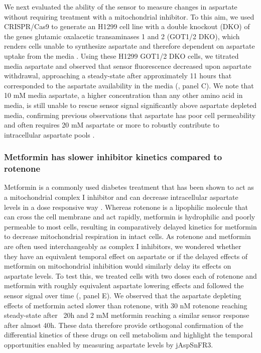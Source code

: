 \documentclass[9pt,lineno]{elife}
\begin{document}
We next evaluated the ability of the sensor to measure changes in aspartate without requiring treatment with a mitochondrial inhibitor.
To this aim, we used CRISPR/Cas9 to generate an H1299 cell line with a double knockout (DKO) of the genes glutamic oxalacetic transaminases 1 and 2 (GOT1/2 DKO), which renders cells unable to synthesize aspartate and therefore dependent on aspartate uptake from the media \citep{Garcia-Bermudez2022-qn}.
Using these H1299 GOT1/2 DKO cells, we titrated media aspartate and observed that sensor fluorescence decreased upon aspartate withdrawal, approaching a steady-state after approximately 11 hours that corresponded to the aspartate availability in the media (, panel C).
We note that 10 mM media aspartate, a higher concentration than any other amino acid in media, is still unable to rescue sensor signal significantly above aspartate depleted media, confirming previous observations that aspartate has poor cell permeability and often requires 20 mM aspartate or more to robustly contribute to intracellular aspartate pools \citep{Sullivan2018-gz}.




\subsubsection{Metformin has slower inhibitor kinetics compared to rotenone}
Metformin is a commonly used diabetes treatment that has been shown to act as a mitochondrial complex I inhibitor \citep{Owen2000-ri, El-Mir2000-qm, Andrzejewski2014-wm, Wheaton2014-ka} and can decrease intracellular aspartate levels in a dose responsive way \citep{Gui2016-ca}.
Whereas rotenone is a lipophilic molecule that can cross the cell membrane and act rapidly, metformin is hydrophilic and poorly permeable to most cells, resulting in comparatively delayed kinetics for metformin to decrease mitochondrial respiration in intact cells.
As rotenone and metformin are often used interchangeably as complex I inhibitors, we wondered whether they have an equivalent temporal effect on aspartate or if the delayed effects of metformin on mitochondrial inhibition would similarly delay its effects on aspartate levels.
To test this, we treated cells with two doses each of rotenone and metformin with roughly equivalent aspartate lowering effects and followed the sensor signal over time (, panel E).
We observed that the aspartate depleting effects of metformin acted slower than rotenone, with 30 nM rotenone reaching steady-state after ~20h and 2 mM metformin reaching a similar sensor response after almost 40h.
These data therefore provide orthogonal confirmation of the differential kinetics of these drugs on cell metabolism and highlight the temporal opportunities enabled by measuring aspartate levels by jAspSnFR3.
\end{document}
